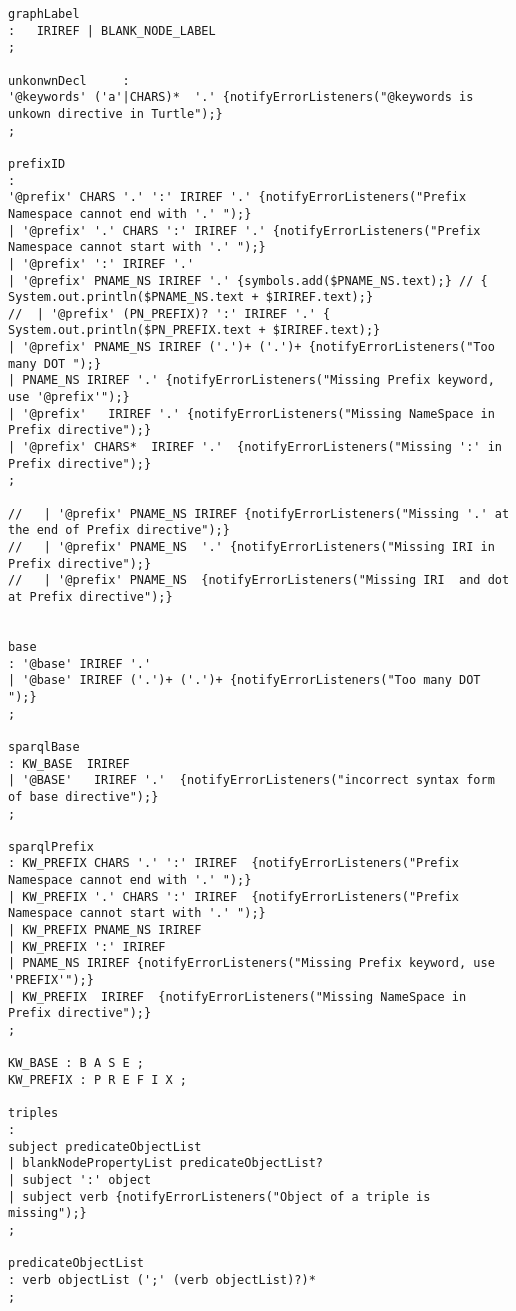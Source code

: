 \begin{lstlisting}[breaklines,basicstyle=\ttfamily]
graphLabel
: 	IRIREF | BLANK_NODE_LABEL
;

unkonwnDecl 	:
'@keywords' ('a'|CHARS)*  '.' {notifyErrorListeners("@keywords is unkown directive in Turtle");}
;	

prefixID
:
'@prefix' CHARS '.' ':' IRIREF '.' {notifyErrorListeners("Prefix Namespace cannot end with '.' ");}
| '@prefix' '.' CHARS ':' IRIREF '.' {notifyErrorListeners("Prefix Namespace cannot start with '.' ");}
| '@prefix' ':' IRIREF '.' 
| '@prefix' PNAME_NS IRIREF '.' {symbols.add($PNAME_NS.text);} // { System.out.println($PNAME_NS.text + $IRIREF.text);} 
//  | '@prefix' (PN_PREFIX)? ':' IRIREF '.' { System.out.println($PN_PREFIX.text + $IRIREF.text);} 
| '@prefix' PNAME_NS IRIREF ('.')+ ('.')+ {notifyErrorListeners("Too many DOT ");}
| PNAME_NS IRIREF '.' {notifyErrorListeners("Missing Prefix keyword, use '@prefix'");}
| '@prefix'   IRIREF '.' {notifyErrorListeners("Missing NameSpace in Prefix directive");}
| '@prefix' CHARS*  IRIREF '.'  {notifyErrorListeners("Missing ':' in Prefix directive");}
;

//   | '@prefix' PNAME_NS IRIREF {notifyErrorListeners("Missing '.' at the end of Prefix directive");}
//   | '@prefix' PNAME_NS  '.' {notifyErrorListeners("Missing IRI in Prefix directive");}
//   | '@prefix' PNAME_NS  {notifyErrorListeners("Missing IRI  and dot at Prefix directive");}


base
: '@base' IRIREF '.'
| '@base' IRIREF ('.')+ ('.')+ {notifyErrorListeners("Too many DOT ");}
;

sparqlBase
: KW_BASE  IRIREF 
| '@BASE'   IRIREF '.'  {notifyErrorListeners("incorrect syntax form of base directive");}
;

sparqlPrefix
: KW_PREFIX CHARS '.' ':' IRIREF  {notifyErrorListeners("Prefix Namespace cannot end with '.' ");}
| KW_PREFIX '.' CHARS ':' IRIREF  {notifyErrorListeners("Prefix Namespace cannot start with '.' ");}
| KW_PREFIX PNAME_NS IRIREF
| KW_PREFIX ':' IRIREF
| PNAME_NS IRIREF {notifyErrorListeners("Missing Prefix keyword, use 'PREFIX'");}
| KW_PREFIX  IRIREF  {notifyErrorListeners("Missing NameSpace in Prefix directive");}
;

KW_BASE : B A S E ;
KW_PREFIX : P R E F I X ;

triples
:    
subject predicateObjectList
| blankNodePropertyList predicateObjectList?
| subject ':' object 
| subject verb {notifyErrorListeners("Object of a triple is missing");}
;

predicateObjectList
: verb objectList (';' (verb objectList)?)*
;


\end{lstlisting}
